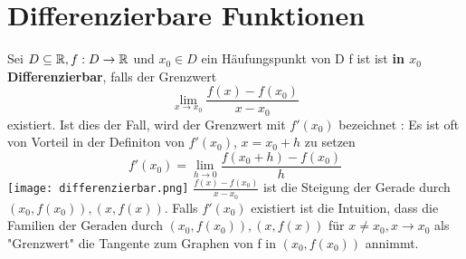 \section{Differenzierbare Funktionen}
\Def[4.1] Sei \( D \subseteq \mathbb{R} , f: D \rightarrow \mathbb{R} \) und \(x_0 \in D\) ein Häufungspunkt von D \newline
f ist ist \textbf{in \(x_0\) Differenzierbar}, falls der Grenzwert
\[ \lim\limits_{x \rightarrow x_0} \frac{f(x) - f(x_0)}{x - x_0}\]
existiert. Ist dies der Fall, wird der Grenzwert mit \(f'(x_0)\) bezeichnet \newline
{}: Es ist oft von Vorteil in der Definiton von \(f'(x_0)\), \(x = x_0 +h\) zu setzen \[f'(x_0) = \lim_{h \rightarrow 0} \frac{f(x_0+h)-f(x_0)}{h}\]
\texttt{[image: differenzierbar.png]} \newline
\( \frac{f(x) - f(x_0)}{x - x_0}\) ist die Steigung der Gerade durch \((x_0, f(x_0)), (x,f(x))\). Falls \(f'(x_0)\) existiert ist die Intuition, dass die Familien der Geraden durch \((x_0, f(x_0)), (x,f(x))\) für \(x \neq x_0, x \rightarrow x_0\) als "Grenzwert" die Tangente zum Graphen von f in \((x_0, f(x_0))\) annimmt.
